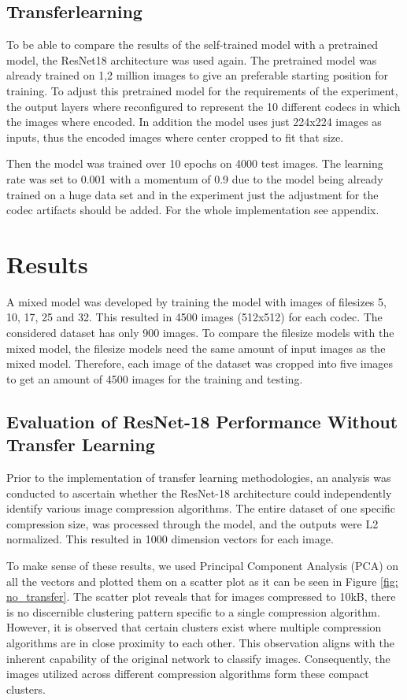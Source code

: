 \subsection{Transferlearning}
To be able to compare the results of the self-trained model with a pretrained model, the ResNet18 architecture was used again. The pretrained model was already trained on 1,2 million images to give an preferable starting position for training. To adjust this pretrained model for the requirements of the experiment, the output layers where reconfigured to represent the 10 different codecs in which the images where encoded.
In addition the model uses just 224x224 images as inputs, thus the encoded images where center cropped to fit that size.



\noindent
Then the model was trained over 10 epochs on 4000 test images. The learning rate was set to 0.001 with a momentum of 0.9 due to the model being already trained on a huge data set and in the experiment just the adjustment for the codec artifacts should be added. For the whole implementation see appendix.

\section{Results}
\label{Results}
A mixed model was developed by training the model with images of filesizes 5, 10, 17, 25 and 32. This resulted in 4500 images (512x512) for each codec. The considered dataset has only 900 images. To compare the filesize models with the mixed model, the filesize models need the same amount of input images as the mixed model. Therefore, each image of the dataset was cropped into five images to get an amount of 4500 images for the training and testing.

\subsection{Evaluation of ResNet-18 Performance Without Transfer Learning} 
Prior to the implementation of transfer learning methodologies, an analysis was conducted to ascertain whether the ResNet-18 architecture could independently identify various image compression algorithms. The entire dataset of one specific compression size, was processed through the model, and the outputs were L2 normalized. This resulted in 1000 dimension vectors for each image.

To make sense of these results, we used Principal Component Analysis (PCA) on all the vectors and plotted them on a scatter plot as it can be seen in Figure \ref{fig: no_transfer}. The scatter plot reveals that for images compressed to 10kB, there is no discernible clustering pattern specific to a single compression algorithm. However, it is observed that certain clusters exist where multiple compression algorithms are in close proximity to each other. This observation aligns with the inherent capability of the original network to classify images. Consequently, the images utilized across different compression algorithms form these compact clusters.

